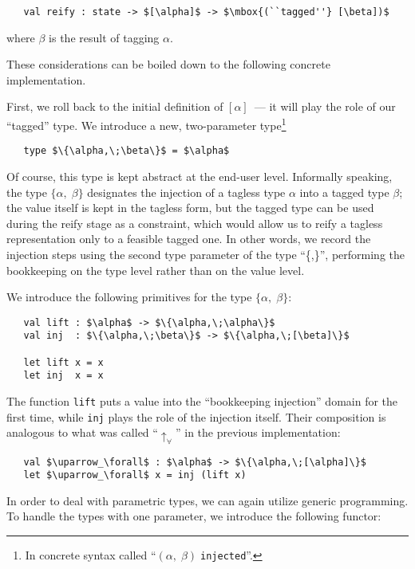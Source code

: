 \begin{lstlisting}
   val reify : state -> $[\alpha]$ -> $\mbox{(``tagged''} [\beta])$
\end{lstlisting}

\noindent where $\beta$ is the result of tagging $\alpha$.

These considerations can be boiled down to the following concrete implementation.

First, we roll back to the initial definition of $[\alpha]$~--- it will play the role of our ``tagged'' type.
We introduce a new, two-parameter type\footnote{In concrete syntax called ``$(\alpha,\;\beta)\;$\lstinline|injected|''.}

\begin{lstlisting}
   type $\{\alpha,\;\beta\}$ = $\alpha$
\end{lstlisting}

Of course, this type is kept abstract at the end-user level. Informally speaking, the type $\{\alpha,\;\beta\}$ designates the
injection of a tagless type $\alpha$ into a tagged type $\beta$; the value itself is kept in the tagless form, but
the tagged type can be used during the reify stage as a constraint, which would allow us to reify a tagless
representation only to a feasible tagged one. In other words, we record the injection steps using the second
type parameter of the type ``\{,\}'', performing the bookkeeping on the type level rather than on the value level.

We introduce the following primitives for the type $\{\alpha,\;\beta\}$:

\begin{lstlisting}
   val lift : $\alpha$ -> $\{\alpha,\;\alpha\}$
   val inj  : $\{\alpha,\;\beta\}$ -> $\{\alpha,\;[\beta]\}$

   let lift x = x
   let inj  x = x
\end{lstlisting}

The function \lstinline{lift} puts a value into the ``bookkeeping injection'' domain for the first time, while
\lstinline{inj} plays the role of the injection itself. Their composition is analogous to what was
called ``$\uparrow_\forall$'' in the previous implementation:

\begin{lstlisting}
   val $\uparrow_\forall$ : $\alpha$ -> $\{\alpha,\;[\alpha]\}$
   let $\uparrow_\forall$ x = inj (lift x)
\end{lstlisting}

In order to deal with parametric types, we can again utilize generic programming. To handle the types with
one parameter, we introduce the following functor:

